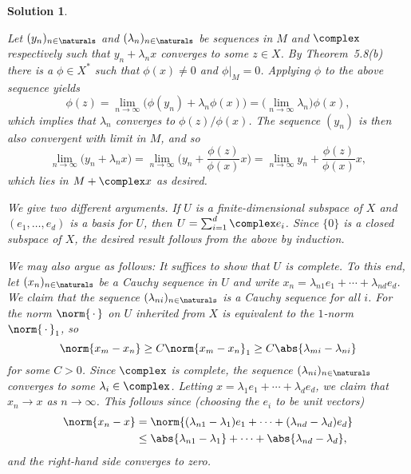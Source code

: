 \documentclass[article, a4paper, 11pt, oneside]{memoir}
\numberwithin{equation}{chapter}
\theoremstyle{nonumberplain}
\newtheorem{solution}{Solution}
\begin{document}
\begin{solution}
\begin{solutionsec}
	\item Let $(y_n)_{n\in\naturals}$ and $(\lambda_n)_{n\in\naturals}$ be sequences in $M$ and $\complex$ respectively such that $y_n + \lambda_n x$ converges to some $z \in X$. By Theorem~5.8(b) there is a $\phi \in X^*$ such that $\phi(x) \neq 0$ and $\phi|_M = 0$. Applying $\phi$ to the above sequence yields
	\begin{equation*}
		\phi(z)
			= \lim_{n\to\infty} \bigl( \phi(y_n) + \lambda_n \phi(x) \bigr)
			= \bigl( \lim_{n\to\infty} \lambda_n \bigr) \phi(x),
	\end{equation*}
	which implies that $\lambda_n$ converges to $\phi(z) / \phi(x)$. The sequence $(y_n)$ is then also convergent with limit in $M$, and so
	\begin{equation*}
		\lim_{n\to\infty} \bigl( y_n + \lambda_n x \bigr)
			= \lim_{n\to\infty} \biggl( y_n + \frac{\phi(z)}{\phi(x)} x \biggr)
			= \lim_{n\to\infty} y_n + \frac{\phi(z)}{\phi(x)} x,
	\end{equation*}
	which lies in $M + \complex x$ as desired.

	\item We give two different arguments. If $U$ is a finite-dimensional subspace of $X$ and $(e_1, \ldots, e_d)$ is a basis for $U$, then $U = \sum_{i=1}^d \complex e_i$. Since $\{0\}$ is a closed subspace of $X$, the desired result follows from the above by induction.
	
	We may also argue as follows: It suffices to show that $U$ is complete. To this end, let $(x_n)_{n\in\naturals}$ be a Cauchy sequence in $U$ and write $x_n = \lambda_{n1} e_1 + \cdots + \lambda_{nd} e_d$. We claim that the sequence $(\lambda_{ni})_{n\in\naturals}$ is a Cauchy sequence for all $i$. For the norm $\norm{\,\cdot\,}$ on $U$ inherited from $X$ is equivalent to the $1$-norm $\norm{\,\cdot\,}_1$, so
	\begin{equation*}
		\norm{x_m - x_n}
			\geq C \norm{x_m - x_n}_1
			\geq C \abs{\lambda_{mi} - \lambda_{ni}}
	\end{equation*}
	for some $C > 0$. Since $\complex$ is complete, the sequence $(\lambda_{ni})_{n\in\naturals}$ converges to some $\lambda_i \in \complex$. Letting $x = \lambda_1 e_1 + \cdots + \lambda_d e_d$, we claim that $x_n \to x$ as $n \to \infty$. This follows since (choosing the $e_i$ to be unit vectors)
	\begin{align*}
		\norm{x_n - x}
			&= \norm{(\lambda_{n1} - \lambda_1)e_1 + \cdots + (\lambda_{nd} - \lambda_d)e_d} \\
			&\leq \abs{\lambda_{n1} - \lambda_1} + \cdots + \abs{\lambda_{nd} - \lambda_d},
	\end{align*}
	and the right-hand side converges to zero.
\end{solutionsec}
\end{solution}
\end{document}
